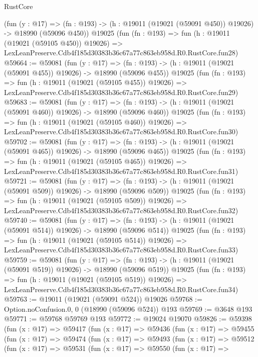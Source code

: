 \begin{lexlean}{RustCore}
\begin{coremodule}
    (fun (y : @17) =>
    (fn : @193) -> (h : @19011 (@19021 (@59091 @450)) @19026) -> @18990 (@59096 @450))
    @19025
    (fun (fn : @193) =>
    fun (h : @19011 (@19021 (@59105 @450)) @19026) =>
    LexLeanPreserve.Cdb4f185d30383b36c67a77c863eb958d.R0.RustCore.fun28)
@59664 := @59081
    (fun (y : @17) =>
    (fn : @193) -> (h : @19011 (@19021 (@59091 @455)) @19026) -> @18990 (@59096 @455))
    @19025
    (fun (fn : @193) =>
    fun (h : @19011 (@19021 (@59105 @455)) @19026) =>
    LexLeanPreserve.Cdb4f185d30383b36c67a77c863eb958d.R0.RustCore.fun29)
@59683 := @59081
    (fun (y : @17) =>
    (fn : @193) -> (h : @19011 (@19021 (@59091 @460)) @19026) -> @18990 (@59096 @460))
    @19025
    (fun (fn : @193) =>
    fun (h : @19011 (@19021 (@59105 @460)) @19026) =>
    LexLeanPreserve.Cdb4f185d30383b36c67a77c863eb958d.R0.RustCore.fun30)
@59702 := @59081
    (fun (y : @17) =>
    (fn : @193) -> (h : @19011 (@19021 (@59091 @465)) @19026) -> @18990 (@59096 @465))
    @19025
    (fun (fn : @193) =>
    fun (h : @19011 (@19021 (@59105 @465)) @19026) =>
    LexLeanPreserve.Cdb4f185d30383b36c67a77c863eb958d.R0.RustCore.fun31)
@59721 := @59081
    (fun (y : @17) =>
    (fn : @193) -> (h : @19011 (@19021 (@59091 @509)) @19026) -> @18990 (@59096 @509))
    @19025
    (fun (fn : @193) =>
    fun (h : @19011 (@19021 (@59105 @509)) @19026) =>
    LexLeanPreserve.Cdb4f185d30383b36c67a77c863eb958d.R0.RustCore.fun32)
@59740 := @59081
    (fun (y : @17) =>
    (fn : @193) -> (h : @19011 (@19021 (@59091 @514)) @19026) -> @18990 (@59096 @514))
    @19025
    (fun (fn : @193) =>
    fun (h : @19011 (@19021 (@59105 @514)) @19026) =>
    LexLeanPreserve.Cdb4f185d30383b36c67a77c863eb958d.R0.RustCore.fun33)
@59759 := @59081
    (fun (y : @17) =>
    (fn : @193) -> (h : @19011 (@19021 (@59091 @519)) @19026) -> @18990 (@59096 @519))
    @19025
    (fun (fn : @193) =>
    fun (h : @19011 (@19021 (@59105 @519)) @19026) =>
    LexLeanPreserve.Cdb4f185d30383b36c67a77c863eb958d.R0.RustCore.fun34)
@59763 := @19011 (@19021 (@59091 @524)) @19026
@59768 := Option.noConfusion.{0, 0} (@18990 (@59096 @524)) @193
@59769 := @3648 @193
@59771 := @59768 @59769 @193
@59772 := @19024 @19070
@59826 := @59398
    (fun (x : @17) =>
    @59417
      (fun (x : @17) =>
      @59436
        (fun (x : @17) =>
        @59455
          (fun (x : @17) =>
          @59474
            (fun (x : @17) =>
            @59493
              (fun (x : @17) =>
              @59512
                (fun (x : @17) =>
                @59531
                  (fun (x : @17) =>
                  @59550
                    (fun (x : @17) =>

\end{coremodule}
\end{lexlean}
